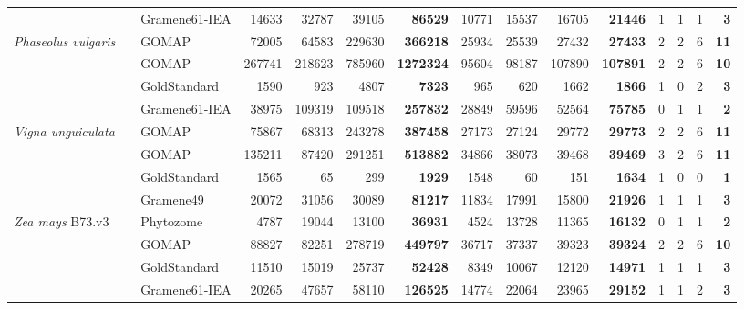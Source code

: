 \documentclass[utf8]{frontiersSCNS}
\begin{document}
\begin{table}[t]
{\begin{threeparttable}
\begin{tabular}{lrlrrr>{\bfseries}r|rrr>{\bfseries}r|rrr>{\bfseries}r}
\rowcolor{gray!6}  \multirow{-4}{*}{\raggedright\arraybackslash \textit{Oryza sativa}} &  & Gramene61-IEA & 14633 & 32787 & 39105 & 86529 & 10771 & 15537 & 16705 & 21446 & 1 & 1 & 1 & 3\\

\textit{Phaseolus vulgaris} &  & GOMAP & 72005 & 64583 & 229630 & 366218 & 25934 & 25539 & 27432 & 27433 & 2 & 2 & 6 & 11\\

\rowcolor{gray!6}   &  & GOMAP & 267741 & 218623 & 785960 & 1272324 & 95604 & 98187 & 107890 & 107891 & 2 & 2 & 6 & 10\\

 &  & GoldStandard & 1590 & 923 & 4807 & 7323 & 965 & 620 & 1662 & 1866 & 1 & 0 & 2 & 3\\

\rowcolor{gray!6}  \multirow{-3}{*}{\raggedright\arraybackslash \textit{Triticum aestivum}} &  & Gramene61-IEA & 38975 & 109319 & 109518 & 257832 & 28849 & 59596 & 52564 & 75785 & 0 & 1 & 1 & 2\\

\textit{Vigna unguiculata} &  & GOMAP & 75867 & 68313 & 243278 & 387458 & 27173 & 27124 & 29772 & 29773 & 2 & 2 & 6 & 11\\

\rowcolor{gray!6}   &  & GOMAP & 135211 & 87420 & 291251 & 513882 & 34866 & 38073 & 39468 & 39469 & 3 & 2 & 6 & 11\\

 &  & GoldStandard & 1565 & 65 & 299 & 1929 & 1548 & 60 & 151 & 1634 & 1 & 0 & 0 & 1\\

\rowcolor{gray!6}   &  & Gramene49 & 20072 & 31056 & 30089 & 81217 & 11834 & 17991 & 15800 & 21926 & 1 & 1 & 1 & 3\\

\multirow{-4}{*}{\raggedright\arraybackslash \textit{Zea mays} B73.v3} &  & Phytozome & 4787 & 19044 & 13100 & 36931 & 4524 & 13728 & 11365 & 16132 & 0 & 1 & 1 & 2\\

\rowcolor{gray!6}   &  & GOMAP & 88827 & 82251 & 278719 & 449797 & 36717 & 37337 & 39323 & 39324 & 2 & 2 & 6 & 10\\

 &  & GoldStandard & 11510 & 15019 & 25737 & 52428 & 8349 & 10067 & 12120 & 14971 & 1 & 1 & 1 & 3\\

\rowcolor{gray!6}  \multirow{-3}{*}{\raggedright\arraybackslash \textit{Zea mays} B73.v4} &  & Gramene61-IEA & 20265 & 47657 & 58110 & 126525 & 14774 & 22064 & 23965 & 29152 & 1 & 1 & 2 & 3\\


\end{tabular}
\end{threeparttable}}
\end{table}
\end{document}
